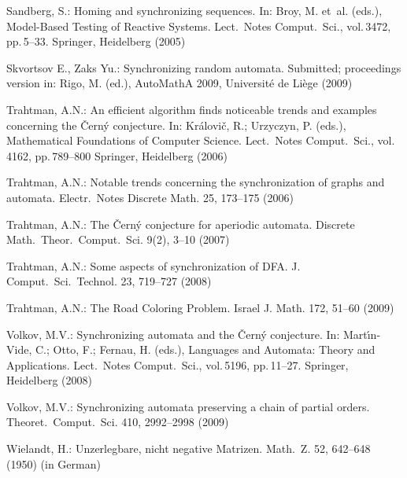 \documentclass[11pt]{llncs}
\begin{document}
\begin{thebibliography}{99}
Sandberg, S.: Homing and synchronizing sequences. In: Broy, M.
et~al. (eds.), Model-Based Testing of Reactive Systems. Lect.\
Notes Comput.\ Sci., vol.\,3472, pp.\,5--33. Springer, Heidelberg
(2005)

Skvortsov E., Zaks Yu.: Synchronizing random automata. Submitted;
proceedings version in: Rigo, M. (ed.), AutoMathA 2009, Universit\'e
de Li\`ege (2009)

Trahtman, A.N.: An efficient algorithm finds noticeable trends
and examples concerning the \v{C}ern\'y conjecture. In:
Kr\'alovi\v{c}, R.; Urzyczyn, P. (eds.), Mathematical Foundations
of Computer Science. Lect.\ Notes Comput.\ Sci., vol.\,4162, pp.\,789--800
Springer, Heidelberg (2006)

Trahtman, A.N.: Notable trends concerning the synchronization
of graphs and automata. Electr.\ Notes Discrete Math. 25, 173--175 (2006)

Trahtman, A.N.: The \v{C}ern\'y conjecture for aperiodic automata.
Discrete Math.\ Theor.\ Comput.\ Sci. 9(2), 3--10 (2007)

Trahtman, A.N.: Some aspects of synchronization of DFA. J. Comput.\ Sci.\
Technol. 23, 719--727 (2008)

Trahtman, A.N.: The Road Coloring Problem. Israel J. Math. 172,
51--60 (2009)

Volkov, M.V.: Synchronizing automata and the \v{C}ern\'{y}
conjecture. In: Mart\'\i{}n-Vide, C.; Otto, F.; Fernau, H. (eds.),
Languages and Automata: Theory and Applications. Lect.\ Notes
Comput.\ Sci., vol.\,5196, pp.\,11--27.  Springer, Heidelberg (2008)

\bibitem{Vo09}
Volkov, M.V.: Synchronizing automata preserving a chain of partial
orders. Theoret.\ Comput.\ Sci. 410, 2992--2998 (2009)

Wielandt, H.: Unzerlegbare, nicht negative Matrizen. Math.\ Z.
52, 642--648 (1950) (in German)
\end{thebibliography}
\end{document}
